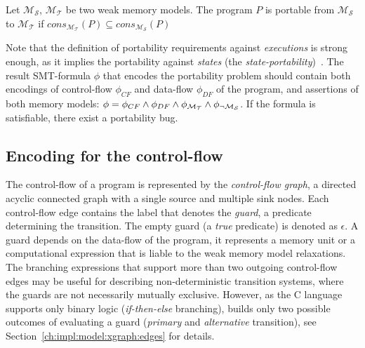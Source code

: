\begin{definition}[Portability]
Let $\mathcal{M_S}$, $\mathcal{M_T}$ be two weak memory models.
The program $P$ is portable from $\mathcal{M_S}$ to $\mathcal{M_T}$ if 
$\textit{cons}_{\mathcal{M_T}}(P) \subseteq \textit{cons}_{\mathcal{M_S}}(P)$
\end{definition}

Note that the definition of portability requirements against \textit{executions} is strong enough, as it implies the portability against \textit{states} (the \textit{state-portability})~\cite{Porthos17b}.
The result SMT-formula $\phi$ that encodes the portability problem should contain both encodings of control-flow $\phi_{CF}$ and data-flow $\phi_{DF}$ of the program, and assertions of both memory models: ${\phi = \phi_{CF} \land \phi_{DF} \land \phi_{\mathcal{M_T}} \land \phi_{\lnot\mathcal{M_S}}}$.
If the formula is satisfiable, there exist a portability bug.


\subsection{Encoding for the control-flow} %
\label{ch:enc:bmc:cf}

The control-flow of a program is represented by the \textit{control-flow graph}, a directed acyclic connected graph with a single source and multiple sink nodes. %
Each control-flow edge contains the label that denotes the \textit{guard}, a predicate determining the transition.
The empty guard (a \textit{true} predicate) is denoted as $\epsilon$.
A guard depends on the data-flow of the program, it represents a memory unit or a computational expression that is liable to the weak memory model relaxations.
The branching expressions that support more than two outgoing control-flow edges may be useful for describing non-deterministic transition systems, where the guards are not necessarily mutually exclusive.
However, as the C language supports only binary logic (\textit{if-then-else} branching), \porthos[2] builds only two possible outcomes of evaluating a guard (\textit{primary} and \textit{alternative} transition), see Section~\ref{ch:impl:model:xgraph:edges} for details.

